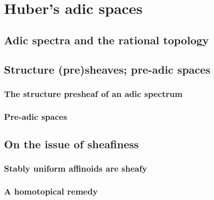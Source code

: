 \section{Huber's adic spaces}
    \subsection{Adic spectra and the rational topology}
    
    \subsection{Structure (pre)sheaves; pre-adic spaces}
        \subsubsection{The structure presheaf of an adic spectrum}
        
        \subsubsection{Pre-adic spaces}
    
    \subsection{On the issue of sheafiness}
        \subsubsection{Stably uniform affinoids are sheafy}
        
        \subsubsection{A homotopical remedy}